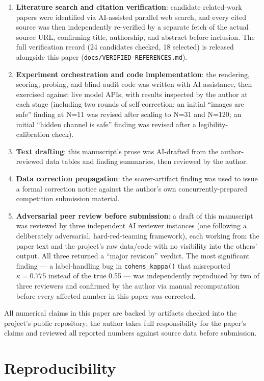 \documentclass[11pt,a4paper]{article}
\begin{document}
\begin{enumerate}
\item \textbf{Literature search and citation verification}: candidate related-work papers were identified via AI-assisted parallel web search, and every cited source was then independently re-verified by a separate fetch of the actual source URL, confirming title, authorship, and abstract before inclusion. The full verification record (24 candidates checked, 18 selected) is released alongside this paper (\texttt{docs/VERIFIED-REFERENCES.md}).
\item \textbf{Experiment orchestration and code implementation}: the rendering, scoring, probing, and blind-audit code was written with AI assistance, then exercised against live model APIs, with results inspected by the author at each stage (including two rounds of self-correction: an initial ``images are safe'' finding at N=11 was revised after scaling to N=31 and N=120; an initial ``hidden channel is safe'' finding was revised after a legibility-calibration check).
\item \textbf{Text drafting}: this manuscript's prose was AI-drafted from the author-reviewed data tables and finding summaries, then reviewed by the author.
\item \textbf{Data correction propagation}: the scorer-artifact finding was used to issue a formal correction notice against the author's own concurrently-prepared competition submission material.
\item \textbf{Adversarial peer review before submission}: a draft of this manuscript was reviewed by three independent AI reviewer instances (one following a deliberately adversarial, hard-red-teaming framework), each working from the paper text and the project's raw data/code with no visibility into the others' output. All three returned a ``major revision'' verdict. The most significant finding --- a label-handling bug in \texttt{cohens\_kappa()} that misreported $\kappa=0.775$ instead of the true 0.55 --- was independently reproduced by two of three reviewers and confirmed by the author via manual recomputation before every affected number in this paper was corrected.
\end{enumerate}

All numerical claims in this paper are backed by artifacts checked into the project's public repository; the author takes full responsibility for the paper's claims and reviewed all reported numbers against source data before submission.

\section*{Reproducibility}
\end{document}
